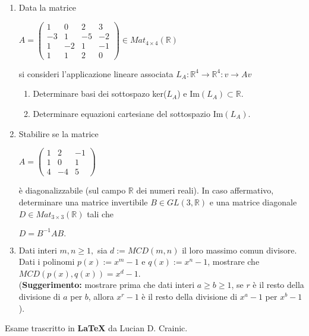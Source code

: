 \documentclass[fleqn]{article}
\begin{document}
\begin{enumerate}
   \item Data la matrice 
   \begin{center}
   $A = \begin{pmatrix}
         1 & 0 & 2 & 3 \\
         -3 & 1 & -5 & -2 \\
         1 & -2 & 1 & -1 \\
         1 & 1 & 2 & 0
      \end{pmatrix}
      \in Mat_{4 \times 4}(\mathbb{R})$
   \end{center}
   si consideri l'applicazione lineare associata $L_A:\mathbb{R}^4 \rightarrow \mathbb{R}^4:v \rightarrow Av$
   \begin{enumerate}
      \item Determinare basi dei sottospazo ker($L_A$) e Im$(L_A)\subset \mathbb{R}$.
      \item Determinare equazioni cartesiane del sottospazio Im$(L_A)$.
   \end{enumerate}

   \item Stabilire se la matrice
   \begin{center}
      $
      A = \begin{pmatrix}
         1 & 2 & -1 \\
         1 & 0 & 1 \\
         4 & -4 & 5
      \end{pmatrix}
   $
   \end{center}
   è diagonalizzabile (sul campo $\mathbb{R}$ dei numeri reali). In caso affermativo, determinare una matrice invertibile
    $B \in GL(3,\mathbb{R})$ e una matrice diagonale $D \in Mat_{3 \times 3}(\mathbb{R})$ tali che  

   \begin{center}
      $D= B^{-1}AB.$
   \end{center}
   
   \item Dati interi $m,n \geq 1,$ sia $d := MCD(m,n)$ il loro massimo comun divisore. Dati i polinomi $p(x) := x^m-1$
   e $q(x) := x^n-1$, mostrare che  $MCD(p(x),q(x)) = x^d-1$. \\
   (\textbf{Suggerimento:} mostrare prima che dati interi 
   $a \geq b \geq 1$, se $r$ è il resto della divisione di $a$ per $b$, allora $x^r-1$ è il resto della divisione
   di $x^a-1$ per $x^b-1$).
\end{enumerate}
Esame trascritto in \textbf{\LaTeX} da Lucian D. Crainic.
\end{document}
